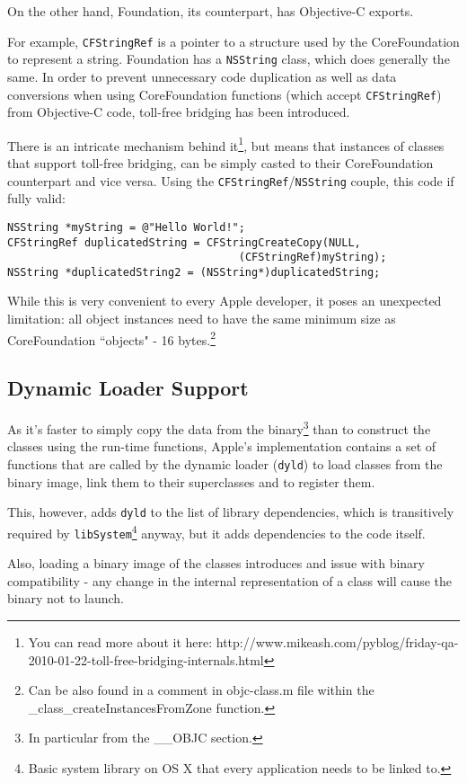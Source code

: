 On the other hand, Foundation, its counterpart, has Objective-C exports.

For example, \verb=CFStringRef= is a pointer to a structure used by the CoreFoundation to represent a string. Foundation has a \verb=NSString= class, which does generally the same. In order to prevent unnecessary code duplication as well as data conversions when using CoreFoundation functions (which accept \verb=CFStringRef=) from Objective-C code, toll-free bridging has been introduced.

There is an intricate mechanism behind it\footnote{You can read more about it here: http://www.mikeash.com/pyblog/friday-qa-2010-01-22-toll-free-bridging-internals.html}, but means that instances of classes that support toll-free bridging, can be simply casted to their CoreFoundation counterpart and vice versa. Using the \verb=CFStringRef=/\verb=NSString= couple, this code if fully valid:

\begin{verbatim}
NSString *myString = @"Hello World!";
CFStringRef duplicatedString = CFStringCreateCopy(NULL, 
                                    (CFStringRef)myString);
NSString *duplicatedString2 = (NSString*)duplicatedString;
\end{verbatim}

While this is very convenient to every Apple developer, it poses an unexpected limitation: all object instances need to have the same minimum size as CoreFoundation ``objects" - 16 bytes.\footnote{Can be also found in a comment in objc-class.m file within the \_class\_createInstancesFromZone function.}

\subsection{Dynamic Loader Support}
As it's faster to simply copy the data from the binary\footnote{In particular from the \_\_OBJC section.} than to construct the classes using the run-time functions, Apple's implementation contains a set of functions that are called by the dynamic loader (\verb=dyld=) to load classes from the binary image, link them to their superclasses and to register them.

This, however, adds \verb=dyld= to the list of library dependencies, which is transitively required by \verb=libSystem=\footnote{Basic system library on OS X that every application needs to be linked to.} anyway, but it adds dependencies to the code itself.

Also, loading a binary image of the classes introduces and issue with binary compatibility - any change in the internal representation of a class will cause the binary not to launch.

